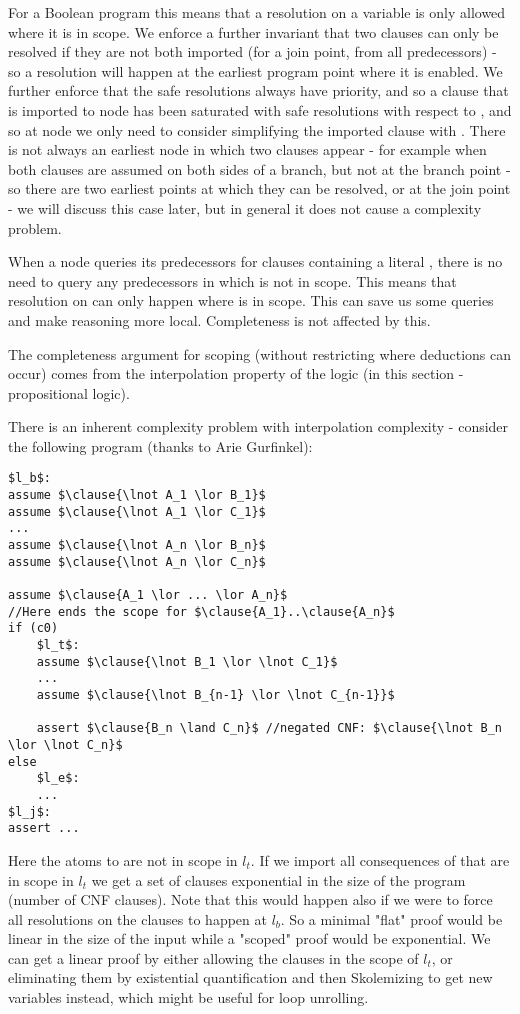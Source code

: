 For a Boolean program this means that a resolution on a variable is only allowed where it is in scope.
We enforce a further invariant that two clauses can only be resolved if they are not both imported (for a join point, from all predecessors) -  so a resolution will happen at the earliest program point where it is enabled.
We further enforce that the safe resolutions always have priority, and so a clause that is imported to node  has been saturated with safe resolutions with respect to , and so at node  we only need to consider simplifying the imported clause with .
There is not always an earliest node in which two clauses appear - for example when both clauses are assumed on both sides of a branch, but not at the branch point - so there are two earliest points at which they can be resolved, or at the join point - we will discuss this case later, but in general it does not cause a complexity problem.

When a node queries its predecessors for clauses containing a literal , there is no need to query any predecessors in which  is not in scope. This means that resolution on  can only happen where  is in scope. This can save us some queries and make reasoning more local. Completeness is not affected by this.

The completeness argument for scoping (without restricting where deductions can occur) comes from the interpolation property of the logic (in this section - propositional logic).

There is an inherent complexity problem with interpolation complexity - consider the following program (thanks to Arie Gurfinkel):
\begin{lstlisting}[mathescape]
$l_b$:
assume $\clause{\lnot A_1 \lor B_1}$
assume $\clause{\lnot A_1 \lor C_1}$
...
assume $\clause{\lnot A_n \lor B_n}$
assume $\clause{\lnot A_n \lor C_n}$

assume $\clause{A_1 \lor ... \lor A_n}$
//Here ends the scope for $\clause{A_1}..\clause{A_n}$
if (c0)
	$l_t$:
	assume $\clause{\lnot B_1 \lor \lnot C_1}$
	...
	assume $\clause{\lnot B_{n-1} \lor \lnot C_{n-1}}$
	
	assert $\clause{B_n \land C_n}$ //negated CNF: $\clause{\lnot B_n \lor \lnot C_n}$
else
	$l_e$:
	...
$l_j$:
assert ...
\end{lstlisting}

Here the atoms  to  are not in scope in $l_t$. If we import all consequences of  that are in scope in $l_t$  we get a set of clauses exponential in the size of the program (number of CNF clauses). 
Note that this would happen also if we were to force all resolutions on the  clauses to happen at $l_b$.
So a minimal "flat" proof would be linear in the size of the input while a "scoped" proof would be exponential.
We can get a linear proof by either allowing the clauses  in the scope of $l_t$, or eliminating them by existential quantification and then Skolemizing to get new variables instead, which might be useful for loop unrolling.

